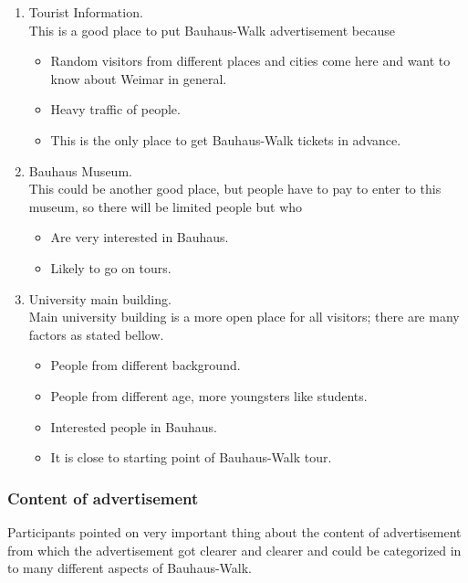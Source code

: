 \begin {enumerate}

\item	Tourist Information. \\
This is a good place to put Bauhaus-Walk advertisement because 
\begin {itemize}
\item	Random visitors from different places and cities come here and want to know about Weimar in general. 
\item	Heavy traffic of people.
\item	This is the only place to get Bauhaus-Walk tickets in advance.
\end{itemize}


\item	Bauhaus Museum. \\
This could be another good place, but people have to pay to enter to this museum, so there will be limited people but who
\begin {itemize}
\item	Are very interested in Bauhaus.
\item	Likely to go on tours.
\end{itemize}


\item	University main building. \\
Main university building is a more open place for all visitors; there are many factors as stated bellow.

\begin {itemize}
\item	People from different background.	
\item	People from different age, more youngsters like students.
\item	Interested people in Bauhaus.
\item	It is close to starting point of Bauhaus-Walk tour.
\end{itemize}


\end{enumerate}


\subsubsection{Content of advertisement}
Participants pointed on very important thing about the content of advertisement from which the advertisement got clearer and clearer and could be categorized in to many different aspects of Bauhaus-Walk.


